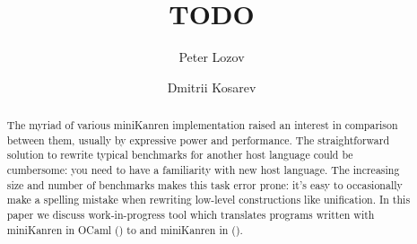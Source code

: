 \documentclass[acmsmall,screen,review,anonymous]{acmart}
\begin{document}
\title{TODO}


\author{Peter Lozov}
\author{Dmitrii Kosarev}


\renewcommand{\shortauthors}{Kosarev and Lozov}

\begin{abstract}
The myriad of various miniKanren implementation raised an interest in comparison between them, usually by expressive power and performance.
The straightforward solution to rewrite typical benchmarks for another host language
could be cumbersome: you need to have a familiarity with new host language.
The increasing size and number of benchmarks makes this task error prone: it's easy to occasionally make a spelling mistake when rewriting low-level constructions like unification. In this paper we discuss work-in-progress tool which translates programs written with miniKanren in OCaml (\OCanren{}) to \Scheme{} and miniKanren in \Kotlin{} (\Klogic{}).

\end{abstract}
\end{document}
